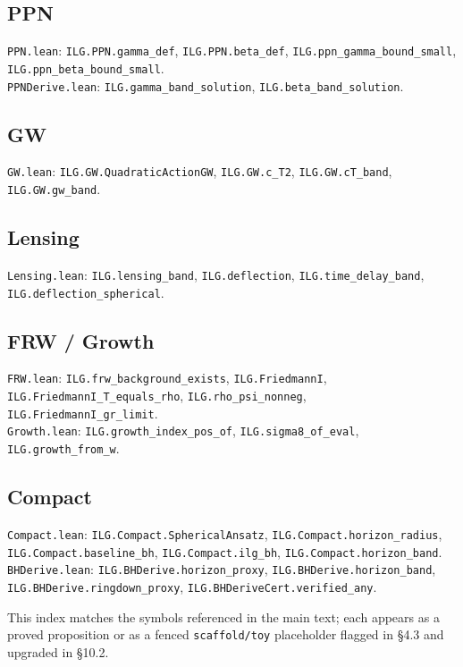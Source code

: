 \documentclass[12pt,a4paper]{article}
\begin{document}
\subsection*{PPN}
\noindent\texttt{PPN.lean}: \texttt{ILG.PPN.gamma\_def}, \texttt{ILG.PPN.beta\_def}, \texttt{ILG.ppn\_gamma\_bound\_small}, \texttt{ILG.ppn\_beta\_bound\_small}.\\
\noindent\texttt{PPNDerive.lean}: \texttt{ILG.gamma\_band\_solution}, \texttt{ILG.beta\_band\_solution}.

\subsection*{GW}
\noindent\texttt{GW.lean}: \texttt{ILG.GW.QuadraticActionGW}, \texttt{ILG.GW.c\_T2}, \texttt{ILG.GW.cT\_band}, \texttt{ILG.GW.gw\_band}.

\subsection*{Lensing}
\noindent\texttt{Lensing.lean}: \texttt{ILG.lensing\_band}, \texttt{ILG.deflection}, \texttt{ILG.time\_delay\_band}, \texttt{ILG.deflection\_spherical}.

\subsection*{FRW / Growth}
\noindent\texttt{FRW.lean}: \texttt{ILG.frw\_background\_exists}, \texttt{ILG.FriedmannI}, \texttt{ILG.FriedmannI\_T\_equals\_rho}, \texttt{ILG.rho\_psi\_nonneg}, \texttt{ILG.FriedmannI\_gr\_limit}.\\
\noindent\texttt{Growth.lean}: \texttt{ILG.growth\_index\_pos\_of}, \texttt{ILG.sigma8\_of\_eval}, \texttt{ILG.growth\_from\_w}.

\subsection*{Compact}
\noindent\texttt{Compact.lean}: \texttt{ILG.Compact.SphericalAnsatz}, \texttt{ILG.Compact.horizon\_radius}, \texttt{ILG.Compact.baseline\_bh}, \texttt{ILG.Compact.ilg\_bh}, \texttt{ILG.Compact.horizon\_band}.\\
\noindent\texttt{BHDerive.lean}: \texttt{ILG.BHDerive.horizon\_proxy}, \texttt{ILG.BHDerive.horizon\_band}, \texttt{ILG.BHDerive.ringdown\_proxy}, \texttt{ILG.BHDeriveCert.verified\_any}.

\medskip
\noindent This index matches the symbols referenced in the main text; each appears as a proved proposition or as a fenced \texttt{scaffold/toy} placeholder flagged in §4.3 and upgraded in §10.2.
\end{document}
